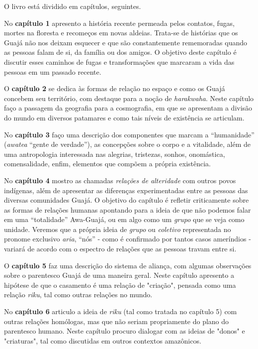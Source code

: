 O livro está dividido em capítulos, seguintes.

No \textbf{capítulo 1} apresento a história recente permeada pelos
contatos, fugas, mortes na floresta e recomeços em novas aldeias.
Trata-se de histórias que os Guajá não nos deixam esquecer e que são
constantemente rememoradas quando as pessoas falam de si, da família ou
dos amigos. O objetivo deste capítulo é discutir esses caminhos de fugas
e transformações que marcaram a vida das pessoas em um passado recente.

O \textbf{capítulo 2} se dedica às formas de relação no espaço e como os
Guajá concebem seu território, com destaque para a noção de
\emph{harakwaha}. Neste capítulo faço a passagem da geografia para a
cosmografia, em que se apresentam a divisão do mundo em diversos
patamares e como tais níveis de existência se articulam.

No \textbf{capítulo 3} faço uma descrição dos componentes que marcam a
``humanidade'' (\emph{awatea} ``gente de verdade''), as concepções sobre
o corpo e a vitalidade, além de uma antropologia interessada nas
alegrias, tristezas, sonhos, onomástica, comensalidade, enfim, elementos
que compõem a própria existência.

No \textbf{capítulo 4} mostro as chamadas \emph{relações de alteridade}
com outros povos indígenas, além de apresentar as diferenças
experimentadas entre as pessoas das diversas comunidades Guajá. O
objetivo do capítulo é refletir criticamente sobre as formas de relações
humanas apontando para a ideia de que não podemos falar em uma
``totalidade'' Awa-Guajá, ou em algo como um \emph{grupo} que se veja
como unidade. Veremos que a própria ideia de \emph{grupo} ou
\emph{coletivo} representada no pronome exclusivo \emph{aria}, ``nós'' -
como é confirmado por tantos casos ameríndios - variará de acordo com o
espectro de relações que as pessoas travam entre si.

O \textbf{capítulo 5} faz uma descrição do sistema de aliança, com
algumas observações sobre o parentesco Guajá de uma maneira geral. Neste
capítulo apresento a hipótese de que o casamento é uma relação de
"criação", pensada como uma relação \emph{riku}, tal como outras
relações no mundo.

No \textbf{capítulo 6} articulo a ideia de \emph{riku} (tal como tratada
no capítulo 5) com outras relações homólogas, mas que não seriam
propriamente do plano do parentesco humano. Neste capítulo procuro
dialogar com as ideias de "donos" e "criaturas", tal como discutidas em
outros contextos amazônicos.

